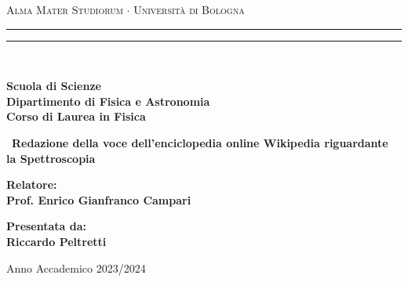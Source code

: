 \documentclass[12pt,a4paper]{report}
\begin{document}
\begin{titlepage}

\begin{center}
{{\Large{\textsc{Alma Mater Studiorum $\cdot$ Universit\`a di Bologna}}}} 
\rule[0.1cm]{15.8cm}{0.1mm}
\rule[0.5cm]{15.8cm}{0.6mm}
\\\vspace{3mm}

{\small{\bf Scuola di Scienze \\ 
Dipartimento di Fisica e Astronomia\\
Corso di Laurea in Fisica}}

\end{center}

\vspace{23mm}

\begin{center}\
{\LARGE{\bf Redazione della voce dell'enciclopedia online Wikipedia riguardante la Spettroscopia}}\\
\end{center}

\vspace{50mm} \par \noindent

\begin{minipage}[t]{0.47\textwidth}\raggedright 
{\large{\bf Relatore: \vspace{2mm}\\
Prof. Enrico Gianfranco Campari
}}
\end{minipage}
%
\hfill
%
\begin{minipage}[t]{0.47\textwidth}\raggedleft
{\large{\bf Presentata da:
\vspace{2mm}\\
Riccardo Peltretti}}
\end{minipage}

\vspace{40mm}

\begin{center}
Anno Accademico 2023/2024
\end{center}

\end{titlepage}

\begin{abstract}
    La presente tesi si propone di migliorare la voce italiana di Wikipedia sulla spettroscopia, un importante strumento nell'ambito della fisica, chimica e astronomia. Partendo dall'analisi delle attuali voci esistenti su Wikipedia in varie lingue, si evidenziano le lacune presenti nella pagina italiana e si propongono integrazioni basate su contenuti scientifici affidabili e aggiornati.
\end{abstract}
\newpage
\end{document}
